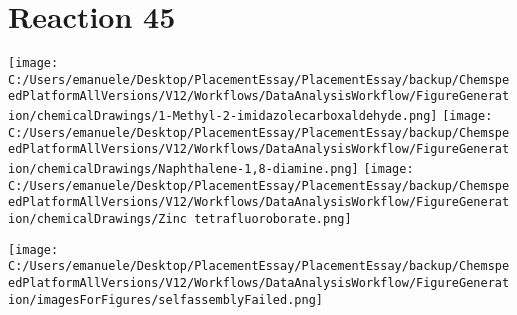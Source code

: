 \documentclass{article}%
\begin{document}
\section*{Reaction 45}%
%
\begin{scheme}[H]%
\begin{minipage}{0.5\textwidth}%
\texttt{[image: C:/Users/emanuele/Desktop/PlacementEssay/PlacementEssay/backup/ChemspeedPlatformAllVersions/V12/Workflows/DataAnalysisWorkflow/FigureGeneration/chemicalDrawings/1-Methyl-2-imidazolecarboxaldehyde.png]}%
\texttt{[image: C:/Users/emanuele/Desktop/PlacementEssay/PlacementEssay/backup/ChemspeedPlatformAllVersions/V12/Workflows/DataAnalysisWorkflow/FigureGeneration/chemicalDrawings/Naphthalene-1,8-diamine.png]}%
\texttt{[image: C:/Users/emanuele/Desktop/PlacementEssay/PlacementEssay/backup/ChemspeedPlatformAllVersions/V12/Workflows/DataAnalysisWorkflow/FigureGeneration/chemicalDrawings/Zinc tetrafluoroborate.png]}%
\end{minipage}%
\begin{minipage}{0.5\textwidth}%
\begin{center}%
\texttt{[image: C:/Users/emanuele/Desktop/PlacementEssay/PlacementEssay/backup/ChemspeedPlatformAllVersions/V12/Workflows/DataAnalysisWorkflow/FigureGeneration/imagesForFigures/selfassemblyFailed.png]}%
\end{center}%
\end{minipage}%
\caption{Self-assembly of components 12, 21, with Zinc(II) in a 3.0:1.5:1.0 molar ratio in CH$_3$CN at 60\textdegree C for 40h. These are the reagents (starting materials) for reaction 45.}%
\end{scheme}%
\end{document}
